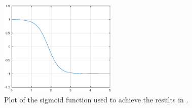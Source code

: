 \begin{figure}[h]
    \centering
    \includegraphics[width=0.5\textwidth]{figures/sig185.eps}
    \caption{Plot of the sigmoid function used to achieve the results in .}
    \label{fig:sig185}
\end{figure}

